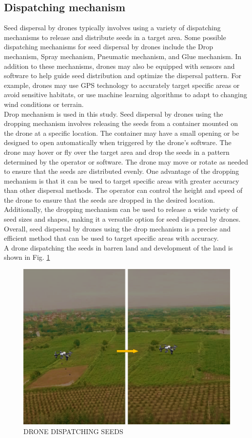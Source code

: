 \documentclass[conference]{IEEEtran}
\begin{document}
\subsection{Dispatching mechanism}

Seed dispersal by drones typically involves using a variety of dispatching mechanisms to release and distribute seeds in a target area\cite{7}. Some possible dispatching mechanisms for seed dispersal by drones include the Drop mechanism, Spray mechanism, Pneumatic mechanism, and Glue mechanism. In addition to these mechanisms, drones may also be equipped with sensors and software to help guide seed distribution and optimize the dispersal pattern. For example, drones may use GPS technology to accurately target specific areas or avoid sensitive habitats, or use machine learning algorithms to adapt to changing wind conditions or terrain.
\\Drop mechanism is used in this study. Seed dispersal by drones using the dropping mechanism involves releasing the seeds from a container mounted on the drone at a specific location. The container may have a small opening or be designed to open automatically when triggered by the drone's software. The drone may hover or fly over the target area and drop the seeds in a pattern determined by the operator or software. The drone may move or rotate as needed to ensure that the seeds are distributed evenly. One advantage of the dropping mechanism is that it can be used to target specific areas with greater accuracy than other dispersal methods. The operator can control the height and speed of the drone to ensure that the seeds are dropped in the desired location. Additionally, the dropping mechanism can be used to release a wide variety of seed sizes and shapes, making it a versatile option for seed dispersal by drones. Overall, seed dispersal by drones using the drop mechanism is a precise and efficient method that can be used to target specific areas with accuracy.
\\A drone dispatching the seeds in barren land and development of the land  is shown in Fig. \ref{dis}

\begin{figure}[htp]
    \centering
    \includegraphics[scale = 0.3]{Slide2.PNG}
    \caption{DRONE DISPATCHING SEEDS}
    \label{dis}
\end{figure}
\end{document}

